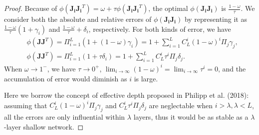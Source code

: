 \documentclass[10pt,journal,compsoc]{IEEEtran}
\begin{document}
\begin{proof}
Because of $\phi(\mathbf{J_iJ_i}^T)=\omega + \tau\phi(\mathbf{J_iJ_i}^T)$, the optimal $\phi(\mathbf{J_iJ_i})$ is $\frac{1-\omega}{\tau}$.
We consider both the absolute and relative errors of $\phi(\mathbf{J_iJ_i})$ by representing it as $\frac{1-\omega}{\tau}(1+\gamma_i)$ and $\frac{1-\omega}{\tau} + \delta_i$, respectively. For both kinds of error, we have
\begin{equation}
\begin{split}
    & \phi\left(\mathbf{JJ}^T\right)\! =\! \Pi_{i=1}^L(1 + (1-\omega)\gamma_i)\!=\!1 + \sum_{i=1}^LC_L^i(1-\omega)^i\Pi_{j}\gamma_j,\\
    & \phi\left(\mathbf{JJ}^T\right) = \Pi_{i=1}^L(1 + \tau\delta_i)= 1 + \sum_{i=1}^LC_L^i\tau^i\Pi_{j}\delta_j.
\end{split}
\label{equ:shallow_network_trick}
\end{equation}
When $\omega\rightarrow1^-$, we have $\tau\rightarrow 0^+$, $\lim_{i\rightarrow\infty}(1-\omega)^i=\lim_{i\rightarrow\infty}\tau^i=0$, and the accumulation of error would diminish as $i$ is large.

Here we borrow the concept of effective depth proposed in Philipp et al. (2018)\cite{philipp2018gradients}: assuming that $C_L^i(1-\omega)^i\Pi_{j}\gamma_j$ and $C_L^i\tau^i\Pi_{j}\delta_j$ are neglectable when $i>\lambda, \lambda<L$, all the errors are only influential within $\lambda$ layers, thus it would be as stable as a $\lambda$-layer shallow network.
\end{proof}
 \vspace{-10pt}
\end{document}
